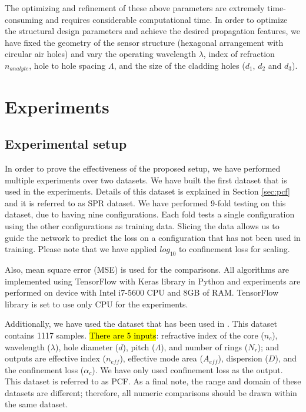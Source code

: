 \documentclass[journal]{IEEEtran}
\begin{document}
The optimizing and refinement of these above parameters are extremely time-consuming and requires considerable computational time. In order to optimize the structural design parameters and achieve the desired propagation features, we have fixed the geometry of the sensor structure (hexagonal arrangement with circular air holes) and vary the operating wavelength $\lambda$, index of refraction $n_{analyte}$, hole to hole spacing $\Lambda$, and the size of the cladding holes ($d_1$, $d_2$ and $d_3$).


\section{Experiments}
\label{sec:exp}

\subsection{Experimental setup}

\def\dszero{PCF}
In order to prove the effectiveness of the proposed setup, we have performed multiple experiments over two datasets. We have built the first dataset that is used in the experiments. Details of this dataset is explained in Section \ref{sec:pcf} and it is referred to as SPR dataset. We have performed 9-fold testing on this dataset, due to having nine configurations. Each fold tests a single configuration using the other configurations as training data. Slicing the data allows us to guide the network to predict the loss on a configuration that has not been used in training. Please note that we have applied $log_{10}$ to confinement loss for scaling.

Also, mean square error (MSE) is used for the comparisons. All algorithms are implemented using TensorFlow with Keras library in Python and experiments are performed on device with Intel i7-5600 CPU and 8GB of RAM. TensorFlow library is set to use only CPU for the experiments.

Additionally, we have used the dataset that has been used in \cite{paper0}. This dataset contains 1117 samples. \hl{There are 5 inputs}: refractive index of the core ($n_c$), wavelength ($\lambda$), hole diameter ($d$), pitch ($\Lambda$), and number of rings ($N_r$);  and outputs are effective index ($n_{eff}$), effective mode area ($A_{eff}$), dispersion ($D$), and the confinement loss ($\alpha_c$). We have only used confinement loss as the output. This dataset is referred to as PCF. As a final note, the range and domain of these datasets are different; therefore, all numeric comparisons should be drawn within the same dataset.
\end{document}
